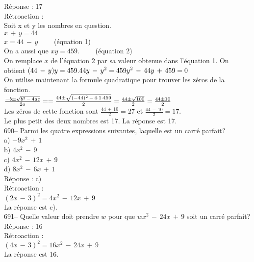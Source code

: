﻿\documentclass[letterpaper, 12pt]{article}
\begin{document}
R\'eponse : 17\\

R\'etroaction : \\
Soit x et y les nombres en question.\\
$x\,+\,y=44$\\
$x=44\,-\,y \qquad$ (\'equation 1)\\
On a aussi que $xy=459. \qquad$ (\'equation 2)\\
On remplace $x$ de l'\'equation 2 par sa valeur obtenue dans l'\'equation 1.
On obtient $(44\,-\,y)y=459.\\
44y\,-\,y^{2}=459\\
y^{2}\,-\,44y\,+\,459=0$\\

On utilise maintenant la formule quadratique pour trouver les z\'eros de la
fonction.\\[2mm]
$\frac{-b\pm \sqrt{b^{2}\,-\,4ac}}{2a}=\\[2mm]
=\frac{44\pm\sqrt{(-44)^{2}\,-\,4\cdot1\cdot459}}{2}\\[2mm]
=\frac{44\pm \sqrt{100}}{2}\\[2mm]
=\frac{44\pm 10}{2}$\\[2mm]
Les z\'eros de cette fonction sont $\frac{44\,+\,10}{2}=27$ et
$\frac{44\,-\,10}{2}=17$.\\[2mm]
Le plus petit des deux nombres est 17.  La r\'eponse est 17.\\


690-- Parmi les quatre expressions suivantes, laquelle est un carr\'e
parfait?\\
a) $-9x^{2}\,+\,1$\\
b) $4x^{2}\,-\,9$\\
c) $4x^{2}\,-\,12x\,+\,9$\\
d) $8x^{2}\,-\,6x\,+\,1$\\

R\'eponse : c)\\

R\'etroaction : \\
$(2x\,-\,3)^{2}=4x^{2}\,-\,12x\,+\,9$\\
La r\'eponse est c).\\

691-- Quelle valeur doit prendre $w$ pour que $wx^{2}\,-\,24x\,+\,9$ soit un
carr\'e parfait?\\

R\'eponse : 16\\

R\'etroaction : \\
$(4x\,-\,3)^{2}=16x^{2}\,-\,24x\,+\,9$\\
La r\'eponse est 16.\\
\end{document}
